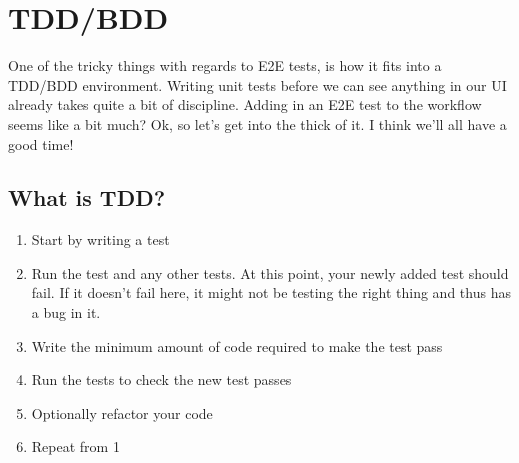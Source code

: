 \maketitle{}
\section{ TDD/BDD }

One of the tricky things with regards to E2E tests, is how it fits into a
TDD/BDD environment. Writing unit tests before we can see anything in our UI
already takes quite a bit of discipline. Adding in an E2E test to the workflow
seems like a bit much? Ok, so let's get into the thick of it. I think we'll all
have a good time!

\subsection{ What is TDD? }

\begin{enumerate}
  \item Start by writing a test
  \item Run the test and any other tests. At this point, your newly added test
   should fail. If it doesn’t fail here, it might not be testing the right
   thing and thus has a bug in it.
  \item Write the minimum amount of code required to make the test pass
  \item Run the tests to check the new test passes
  \item Optionally refactor your code
  \item Repeat from 1
\end{enumerate}

